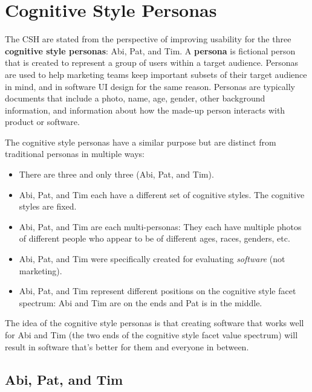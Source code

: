 \section{Cognitive Style Personas}

The CSH are stated from the perspective of improving usability for the three \textbf{cognitive style personas}: Abi, Pat, and Tim. A \textbf{persona} is fictional person that is created to represent a group of users within a target audience. Personas are used to help marketing teams keep important subsets of their target audience in mind, and in software UI design for the same reason. Personas are typically documents that include a photo, name, age, gender, other background information, and information about how the made-up person interacts with product or software.

The cognitive style personas have a similar purpose but are distinct from traditional personas in multiple ways:
\begin{itemize}
\item{There are three and only three (Abi, Pat, and Tim).}
\item{Abi, Pat, and Tim each have a different set of cognitive styles. The cognitive styles are fixed.}
\item{Abi, Pat, and Tim are each multi-personas: They each have multiple photos of different people who appear to be of different ages, races, genders, etc.}
\item{Abi, Pat, and Tim were specifically created for evaluating \textit{software} (not marketing).}
\item{Abi, Pat, and Tim represent different positions on the cognitive style facet spectrum: Abi and Tim are on the ends and Pat is in the middle.}
\end{itemize}

The idea of the cognitive style personas is that creating software that works well for Abi and Tim (the two ends of the cognitive style facet value spectrum) will result in software that's better for them and everyone in between.

\nomargins
\subsection{Abi, Pat, and Tim}

